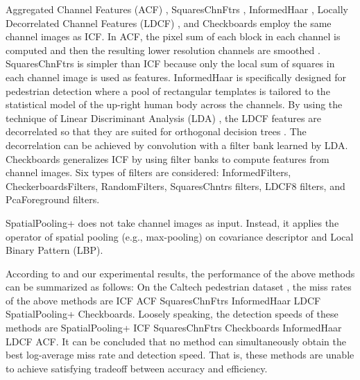 \documentclass[10pt,twocolumn,letterpaper]{article}
\begin{document}
Aggregated Channel Features (ACF) \cite{Dollar_ACF_PAMI_2014}, SquaresChnFtrs \cite{Benenson_SquareChns_CVPR_2013}, InformedHaar \cite{Zhang_Info.Haar_CVPR_2014}, Locally Decorrelated 
Channel Features (LDCF) \cite{Nam_LDCF_NIPS_2014}, and Checkboards \cite{Zhang_FCF_CVPR_2015} employ the same channel images as ICF. In ACF, 
the pixel sum of each block in each channel is computed and then 
the resulting lower resolution channels are smoothed \cite{Dollar_ACF_PAMI_2014,Dollar_FastestWest_BMVC_2010}. SquaresChnFtrs \cite{Benenson_SquareChns_CVPR_2013} is simpler 
than ICF because only the local sum of squares in each channel image is used as 
features. InformedHaar \cite{Zhang_Info.Haar_CVPR_2014} is specifically 
designed for pedestrian detection where a pool of rectangular templates is 
tailored to the statistical model of the up-right human body across the 
channels. By using the technique of Linear Discriminant Analysis (LDA) \cite{Hariharan_DDCC_ECCV_2012}, the LDCF 
features are decorrelated so that they are suited for orthogonal decision 
trees \cite{Nam_LDCF_NIPS_2014}. The decorrelation can be achieved by convolution with a filter 
bank learned by LDA. Checkboards \cite{Zhang_FCF_CVPR_2015} generalizes ICF by using filter banks to compute 
features from channel images. Six types of filters are 
considered: InformedFilters, CheckerboardsFilters, RandomFilters, 
SquaresChntrs filters, LDCF8 filters, and PcaForeground filters. 

SpatialPooling+ \cite{Paisitkriangkrai_SpatialPool_arXiv_2014,Paisitkriangkrai_SpatialPool_ECCV_2014} does not take channel images as input. Instead, it applies 
the operator of spatial pooling (e.g., max-pooling) on covariance descriptor 
and Local Binary Pattern (LBP). 

According to \cite{Benenson_TenYears_ECCV_2014} and our experimental results, the performance of the above 
methods can be summarized as follows: On the Caltech pedestrian dataset 
\cite{Caltech,Dollar_PD_PAMI_2012}, the miss rates of the above 
methods are ICF  ACF  SquaresChnFtrs  InformedHaar  LDCF  SpatialPooling+  
Checkboards. Loosely speaking, the detection speeds of these 
methods are SpatialPooling+  ICF  SquaresChnFtrs  Checkboards  InformedHaar  LDCF  
ACF. It can be concluded that no method can simultaneously obtain the best 
log-average miss rate and detection speed. That is, these methods are unable 
to achieve satisfying tradeoff between accuracy and efficiency. 
\end{document}
